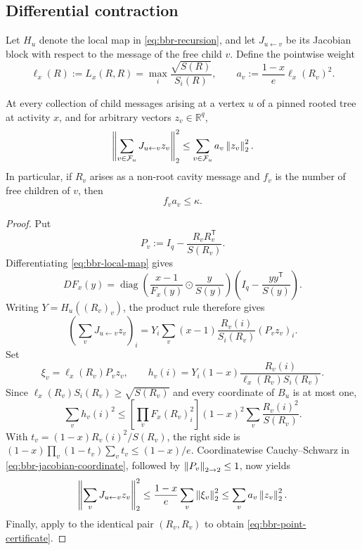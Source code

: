 \subsection{Differential contraction}

Let \(H_u\) denote the local map in \eqref{eq:bbr-recursion}, and let
\(J_{u\leftarrow v}\) be its Jacobian block with respect to the message of
the free child \(v\).  Define the pointwise weight
\begin{equation}
 \ell_x(R):=L_x(R,R)
   =\max_i\frac{\sqrt{S(R)}}{S_i(R)},
 \qquad
 a_v:=\frac{1-x}{e}\ell_x(R_v)^2.
 \label{eq:bbr-point-weight}
\end{equation}

\begin{lemma}
\label{lem:bbr-differential}
At every collection of child messages arising at a vertex \(u\) of a pinned
rooted tree at activity \(x\), and for arbitrary vectors
\(z_v\in\mathbb R^q\),
\begin{equation}
 \left\|\sum_{v\in\mathcal F_u}J_{u\leftarrow v}z_v\right\|_2^2
 \le\sum_{v\in\mathcal F_u}a_v\left\|z_v\right\|_2^2.
 \label{eq:bbr-differential}
\end{equation}
In particular, if \(R_v\) arises as a non-root cavity message and \(f_v\) is
the number of free children of \(v\), then
\begin{equation}
 f_va_v\le\kappa.
 \label{eq:bbr-point-certificate}
\end{equation}
\end{lemma}

\begin{proof}
Put
\[
 P_v:=I_q-\frac{R_vR_v^{\mathsf T}}{S(R_v)}.
\]
Differentiating \eqref{eq:bbr-local-map} gives
\[
 DF_x(y)=
 \operatorname{diag}\!\left(
   \frac{x-1}{F_x(y)}\odot\frac{y}{S(y)}
 \right)
 \left(I_q-\frac{yy^{\mathsf T}}{S(y)}\right).
\]
Writing \(Y=H_u((R_v)_v)\), the product rule therefore gives
\begin{equation}
 \left(\sum_vJ_{u\leftarrow v}z_v\right)_i
 =Y_i\sum_v(x-1)\frac{R_v(i)}{S_i(R_v)}(P_vz_v)_i.
 \label{eq:bbr-jacobian-coordinate}
\end{equation}
Set
\[
 \xi_v=\ell_x(R_v)P_vz_v,
 \qquad
 h_v(i)=Y_i(1-x)
   \frac{R_v(i)}{\ell_x(R_v)S_i(R_v)}.
\]
Since \(\ell_x(R_v)S_i(R_v)\ge\sqrt{S(R_v)}\) and every coordinate of
\(B_u\) is at most one,
\[
 \sum_vh_v(i)^2
 \le
 \left[\prod_vF_x(R_v)_i^2\right](1-x)^2
 \sum_v\frac{R_v(i)^2}{S(R_v)}.
\]
With \(t_v=(1-x)R_v(i)^2/S(R_v)\), the right side is
\((1-x)\prod_v(1-t_v)\sum_vt_v\le(1-x)/e\).  Coordinatewise
Cauchy--Schwarz in \eqref{eq:bbr-jacobian-coordinate}, followed by
\(\left\|P_v\right\|_{2\to2}\le1\), now yields
\[
 \left\|\sum_vJ_{u\leftarrow v}z_v\right\|_2^2
 \le\frac{1-x}{e}\sum_v\left\|\xi_v\right\|_2^2
 \le\sum_va_v\left\|z_v\right\|_2^2.
\]
Finally, apply  to the identical pair
\((R_v,R_v)\) to obtain \eqref{eq:bbr-point-certificate}.
\end{proof}

